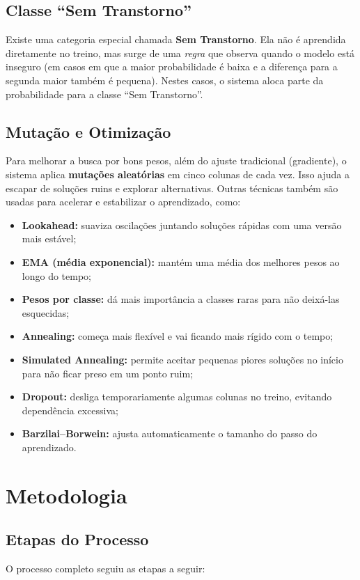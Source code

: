 \documentclass[12pt,a4paper]{article}
\begin{document}
\subsection*{Classe ``Sem Transtorno''}
Existe uma categoria especial chamada \textbf{Sem Transtorno}.
Ela não é aprendida diretamente no treino, mas surge de uma \emph{regra} que observa quando o modelo está inseguro
(em casos em que a maior probabilidade é baixa e a diferença para a segunda maior também é pequena). Nestes casos,
o sistema aloca parte da probabilidade para a classe ``Sem Transtorno''.

\subsection*{Mutação e Otimização}
Para melhorar a busca por bons pesos, além do ajuste tradicional (gradiente), o sistema aplica \textbf{mutações aleatórias}
em cinco colunas de cada vez. Isso ajuda a escapar de soluções ruins e explorar alternativas.
Outras técnicas também são usadas para acelerar e estabilizar o aprendizado, como:
\begin{itemize}
    \item \textbf{Lookahead:} suaviza oscilações juntando soluções rápidas com uma versão mais estável;
    \item \textbf{EMA (média exponencial):} mantém uma média dos melhores pesos ao longo do tempo;
    \item \textbf{Pesos por classe:} dá mais importância a classes raras para não deixá-las esquecidas;
    \item \textbf{Annealing:} começa mais flexível e vai ficando mais rígido com o tempo;
    \item \textbf{Simulated Annealing:} permite aceitar pequenas piores soluções no início para não ficar preso em um ponto ruim;
    \item \textbf{Dropout:} desliga temporariamente algumas colunas no treino, evitando dependência excessiva;
    \item \textbf{Barzilai--Borwein:} ajusta automaticamente o tamanho do passo do aprendizado.
\end{itemize}

\section*{Metodologia}

\subsection*{Etapas do Processo}
O processo completo seguiu as etapas a seguir:
\end{document}
